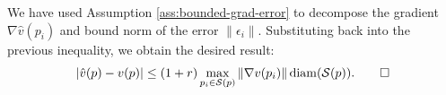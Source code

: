 \documentclass[10pt]{article} %
\theoremstyle{plain}
\theoremstyle{definition}
\theoremstyle{remark}
\begin{document}
We have used Assumption \ref{ass:bounded-grad-error} to decompose the gradient $\nabla \hat{v}(p_i)$ and bound norm of the error $\|\epsilon_i\|$. Substituting back into the previous inequality, we obtain the desired result:
\[
|\hat{v}(p) - v(p)| \leq (1+r) \max_{p_i \in \mathcal{S}(p)} \|\nabla v(p_i)\| \operatorname{diam}(\mathcal{S}(p)). \qed
\]



\end{document}
